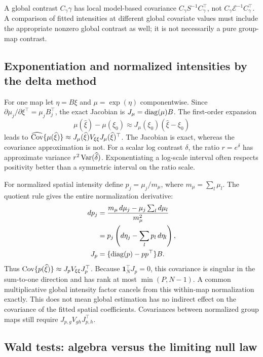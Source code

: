 A global contrast $C_\gamma\gamma$ has local model-based covariance
$C_\gamma S^{-1}C_\gamma^\top$, not
$C_\gamma\mathcal E^{-1}C_\gamma^\top$.  A comparison of fitted
intensities at different global covariate values must include the
appropriate nonzero global contrast as well; it is not necessarily a
pure group-map contrast.

\subsection{Exponentiation and normalized intensities by the delta method}
\label{cov-delta}

For one map let $\eta=B\xi$ and $\mu=\exp(\eta)$ componentwise.
Since $\partial\mu_j/\partial\xi^\top=\mu_jB_j^\top$,
the exact Jacobian is $J_\mu=\operatorname{diag}(\mu)B$.  The first-order expansion
\[
 \mu(\widehat\xi)-\mu(\xi_0)
       \approx J_\mu(\xi_0)(\widehat\xi-\xi_0)
\]
leads to
$\widehat{\operatorname{Cov}}\{\mu(\widehat\xi)\}
\approx J_\mu(\widehat\xi)V_{\xi\xi}J_\mu(\widehat\xi)^\top$.
The Jacobian is exact, whereas the covariance approximation is not.
For a scalar log contrast $\delta$, the ratio $r=e^\delta$ has
approximate variance $r^2\operatorname{Var}(\widehat\delta)$.  Exponentiating a
log-scale interval often respects positivity better than a symmetric
interval on the ratio scale.

For normalized spatial intensity define
$p_j=\mu_j/m_\mu$, where $m_\mu=\sum_l\mu_l$.
The quotient rule gives the entire normalization derivative:
\begin{align}
 dp_j
 &=\frac{m_\mu\,d\mu_j-\mu_j\sum_l d\mu_l}{m_\mu^2}\\
 &=p_j\left(d\eta_j-\sum_lp_l\,d\eta_l\right),\\
 J_p&=\{\operatorname{diag}(p)-pp^\top\}B .
 \label{cov-normalized-jacobian}
\end{align}
Thus $\operatorname{Cov}\{p(\widehat\xi)\}\approx J_pV_{\xi\xi}J_p^\top$.
Because $\mathbf1_N^\top J_p=0$, this covariance is singular in the
sum-to-one direction and has rank at most $\min(P,N-1)$.
A common multiplicative global intensity factor cancels from this
within-map normalization exactly.  This does not mean global
estimation has no indirect effect on the covariance of the fitted
spatial coefficients.  Covariances between normalized group maps
still require $J_{p,g}V_{gh}J_{p,h}^\top$.

\subsection{Wald tests: algebra versus the limiting null law}
\label{cov-wald}

